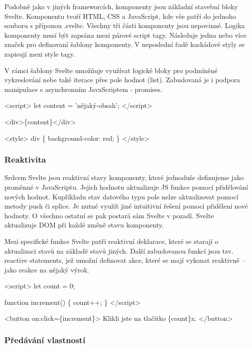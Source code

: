 Podobně jako v jiných frameworcích, komponenty jsou základní stavební bloky Svelte. Komponentu tvoří HTML, CSS a JavaScript, kde vše patří do jednoho souboru s příponou .svelte. 
Všechny tři části komponenty jsou nepovinné. Logika komponenty musí být zapsána mezi párové script tagy. Následuje jedna nebo více značek pro definovaní šablony komponenty. 
V neposlední řadě kaskádové styly se zapisují mezi style tagy.

V rámci šablony Svelte umožňuje využívat logické bloky pro podmíněné vykreslování nebe také iterace přes pole hodnot (list). 
Zabudovaná je i podpora manipulace s asynchronním JavaScriptem - promises.\cite{svelte}

\begin{prog}
<script>
  let content = 'nějaký-obsah';
</script>

<div>\{content\}</div>
  
<style>
  div \{
    background-color: red;
  \}
</style>
\end{prog}

\subsubsection{Reaktivita}

Srdcem Svelte jsou reaktivní stavy komponenty, které jednoduše definujeme jako proměnné v JavaScriptu. Jejich hodnotu aktualizuje JS funkce pomocí přidělování nových hodnot. 
Kupříkladu stav datového typu pole nelze aktualizovat pomocí metody push či splice. Je nutné využít jiné intuitivní řešení pomocí přidělení nové hodnoty.
O všechno ostatní se pak postará sám Svelte v pozadí. Svelte aktualizuje DOM při každé změně stavu komponenty. 

Mezi specifické funkce Svelte patří reaktivní deklarace, které se starají o aktualizaci stavů na základě stavů jiných. 
Další zabudovanou funkcí jsou tzv. reactive statements, jež umožní definovat akce, které se mají vykonat reaktivně -- jako reakce na nějaký výrok.\cite{sveltehandbook,svelte}

\begin{prog}
<script>
  let count = 0;

  function increment() \{
    count++;
  \}
</script>

<button on:click=\{increment\}>
  Klikli jste na tlačítko \{count\}x.
</button>
\end{prog}

\subsubsection{Předávání vlastností}

